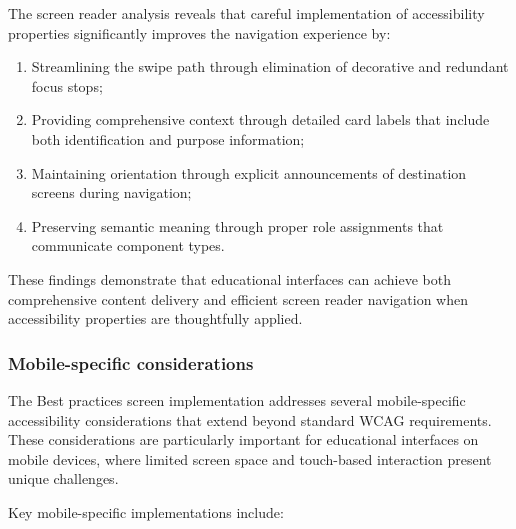 The screen reader analysis reveals that careful implementation of accessibility properties significantly improves the navigation experience by:

\begin{enumerate}
    \item Streamlining the swipe path through elimination of decorative and redundant focus stops;
    
    \item Providing comprehensive context through detailed card labels that include both identification and purpose information;
    
    \item Maintaining orientation through explicit announcements of destination screens during navigation;
    
    \item Preserving semantic meaning through proper role assignments that communicate component types.
\end{enumerate}

These findings demonstrate that educational interfaces can achieve both comprehensive content delivery and efficient screen reader navigation when accessibility properties are thoughtfully applied.

\subsubsection{Mobile-specific considerations}
\label{subsubsec:best-practices-mobile-specific}

The Best practices screen implementation addresses several mobile-specific accessibility considerations that extend beyond standard WCAG requirements. These considerations are particularly important for educational interfaces on mobile devices, where limited screen space and touch-based interaction present unique challenges.

Key mobile-specific implementations include:

